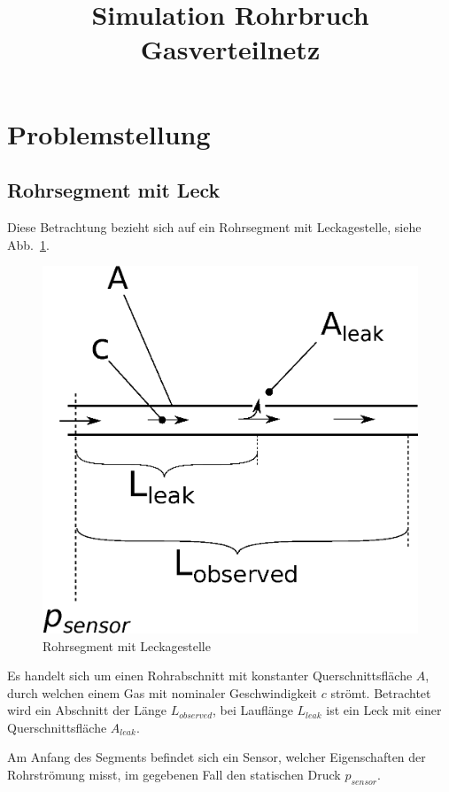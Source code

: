 \documentclass[a4paper,10pt,twocolumn]{article}
\title{Simulation Rohrbruch Gasverteilnetz}
\author{}
\date{}
\begin{document}
\maketitle

\section{Problemstellung}

\subsection{Rohrsegment mit Leck}

Diese Betrachtung bezieht sich auf ein Rohrsegment mit Leckagestelle, siehe Abb.~\ref{fig:bruch}.

\begin{figure}[hbp]
\centering
\includegraphics[width=0.9\hsize]{bruch.eps}
\caption{Rohrsegment mit Leckagestelle}
\label{fig:bruch}
\end{figure}

Es handelt sich um einen Rohrabschnitt mit konstanter Querschnittsfläche $A$, durch welchen einem Gas mit nominaler Geschwindigkeit $c$ strömt. Betrachtet wird ein Abschnitt der Länge $L_\mathit{observed}$, bei Lauflänge $L_\mathit{leak}$ ist ein Leck mit einer Querschnittsfläche $A_\mathit{leak}$.

Am Anfang des Segments befindet sich ein Sensor, welcher Eigenschaften der Rohrströmung misst, im gegebenen Fall den statischen Druck $p_\textit{sensor}$.
\end{document}
